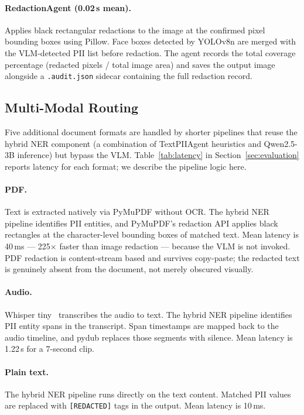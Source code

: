 \paragraph{RedactionAgent (0.02\,s mean).}
Applies black rectangular redactions to the image
at the confirmed pixel bounding boxes using Pillow.
Face boxes detected by YOLOv8n are merged with the
VLM-detected PII list before redaction.
The agent records the total coverage percentage
(redacted pixels / total image area) and saves the
output image alongside a \texttt{.audit.json} sidecar
containing the full redaction record.

\subsection{Multi-Modal Routing}
\label{sec:multimodal}

Five additional document formats are handled by
shorter pipelines that reuse the hybrid NER component
(a combination of TextPIIAgent heuristics and
Qwen2.5-3B inference) but bypass the VLM.
Table~\ref{tab:latency} in Section~\ref{sec:evaluation}
reports latency for each format; we describe the
pipeline logic here.

\paragraph{PDF.}
Text is extracted natively via PyMuPDF without OCR.
The hybrid NER pipeline identifies PII entities,
and PyMuPDF's redaction API applies black rectangles
at the character-level bounding boxes of matched
text.
Mean latency is 40\,ms --- 225$\times$ faster than
image redaction --- because the VLM is not invoked.
PDF redaction is content-stream based and survives
copy-paste; the redacted text is genuinely absent
from the document, not merely obscured visually.

\paragraph{Audio.}
Whisper tiny~\cite{radford2022whisper} transcribes
the audio to text.
The hybrid NER pipeline identifies PII entity spans
in the transcript.
Span timestamps are mapped back to the audio timeline,
and pydub replaces those segments with silence.
Mean latency is 1.22\,s for a 7-second clip.

\paragraph{Plain text.}
The hybrid NER pipeline runs directly on the text
content.
Matched PII values are replaced with
\texttt{[REDACTED]} tags in the output.
Mean latency is 10\,ms.


